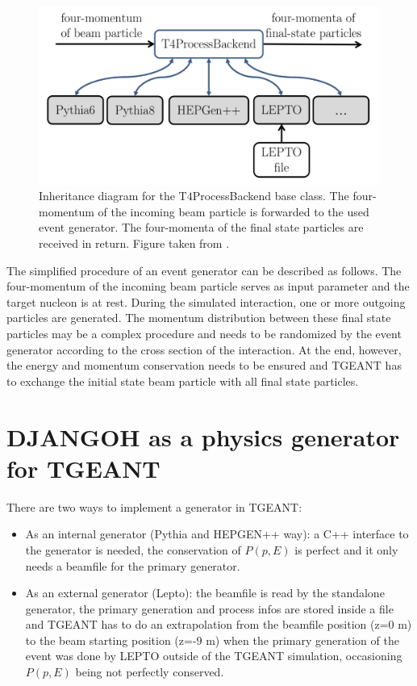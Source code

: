 \begin{figure}[!h]
  \centering
	\includegraphics[scale=0.5]{./gfx/Processbackend.png}
	\caption{Inheritance diagram for the T$4$ProcessBackend base class. The four- momentum of the incoming beam particle is forwarded to the used event generator. The four-momenta of the final state particles are received in return. Figure taken from \cite{Tobias}.}
	\label{pic:Processbackend}
\end{figure}

The simplified procedure of an event generator can be described as follows. The four-momentum of the incoming beam particle serves as input parameter and the target nucleon is at rest. During the simulated interaction, one or more outgoing particles are generated. The momentum distribution between these final state particles may be a complex procedure and needs to be randomized by the event generator according to the cross section of the interaction. At the end, however, the energy and momentum conservation needs to be ensured and TGEANT has to exchange the initial state beam particle with all final state particles.



\section{DJANGOH as a physics generator for TGEANT}

There are two ways to implement a generator in TGEANT:
\begin{itemize}
\item As an internal generator (Pythia and HEPGEN++ way): a C++ interface to the generator is needed, the conservation of $P(p,E)$ is perfect and it only needs a beamfile for the primary generator.
\item As an external generator (Lepto): the beamfile is read by the standalone
generator, the primary generation and process infos are stored inside a file and TGEANT has to do an extrapolation from the beamfile position (z=$0$ m) to the beam starting position (z=-$9$ m) when the primary generation of the event was done by LEPTO outside of the TGEANT simulation, occasioning $P(p,E)$ being not perfectly conserved.
\end{itemize}

